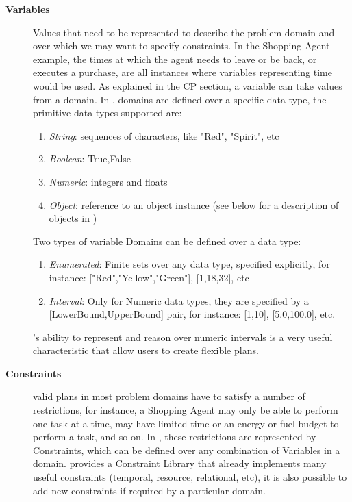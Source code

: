 \begin{description}

\item[\textbf{Variables}] Values that need to be represented to
  describe the problem domain and over which we may want to specify
  constraints. In the Shopping Agent example, the times at which the
  agent needs to leave or be back, or executes a purchase, are all
  instances where variables representing time would be used.  As
  explained in the \textsf{CP} section, a variable can take values
  from a domain. In \eu, domains are defined over a specific data
  type, the primitive data types supported are:

  \begin{enumerate}
  \item \textit{String}: sequences of characters, like "Red",
    "Spirit", etc

  \item \textit{Boolean}: {True,False}

  \item \textit{Numeric}: integers and floats

  \item \textit{Object}: reference to an object instance (see below
    for a description of objects in \eu)
  
\end {enumerate}

Two types of variable Domains can be defined over a data type:

  \begin{enumerate}
  \item \textit{Enumerated}: Finite sets over any data type, specified
    explicitly, for instance: ["Red","Yellow","Green"], [1,18,32], etc
  \item \textit{Interval}: Only for Numeric data types, they are
    specified by a [LowerBound,UpperBound] pair, for instance: [1,10],
    [5.0,100.0], etc.
  \end {enumerate}

  \eu's ability to represent and reason over numeric intervals is a
  very useful characteristic that allow users to create flexible
  plans. 

\item[\textbf{Constraints}] valid plans in most problem domains have
  to satisfy a number of restrictions, for instance, a Shopping Agent
  may only be able to perform one task at a time, may have limited
  time or an energy or fuel budget to perform a task, and so on. In
  \eu, these restrictions are represented by Constraints, which can be
  defined over any combination of Variables in a domain. \eu provides
  a Constraint Library that already implements many useful constraints
  (temporal, resource, relational, etc), it is also possible to add
  new constraints if required by a particular domain.


\end{description}
